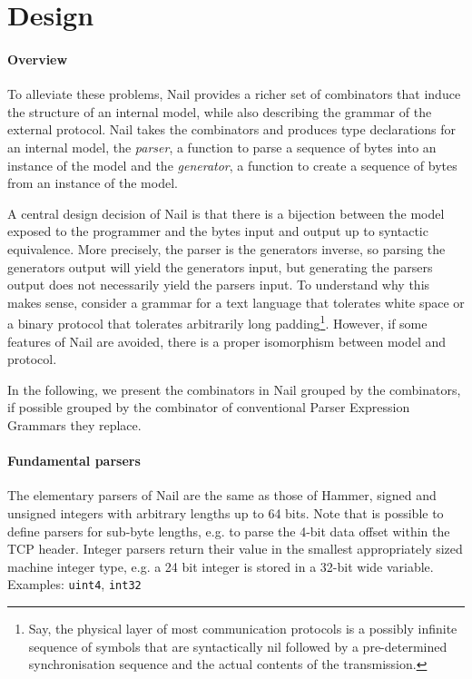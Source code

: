 \section{Design}

\paragraph{Overview}
To alleviate these problems, Nail provides a richer set of combinators that induce the structure of
an internal model, while also describing the grammar of the external protocol. Nail takes the
combinators and produces type declarations for an internal model, the \textit{parser}, a function to parse a sequence of
bytes into an instance of the model and the \textit{generator}, a function to create a sequence of
bytes from an instance of the model.

A central design decision of Nail is that there is a  bijection between the model exposed to the programmer and the bytes
input and output up to syntactic equivalence. More precisely, the parser is the generators inverse,
so parsing the generators output will yield the generators input, but generating the parsers output
does not necessarily yield the parsers input. To understand why this makes sense, consider a grammar
for a text language that tolerates white space or a binary protocol that tolerates arbitrarily long
padding\footnote{Say, the physical layer of most communication protocols is a possibly infinite
  sequence of symbols that are syntactically nil followed by a pre-determined synchronisation
  sequence and the actual contents of the transmission.}. However, if some features of Nail are
avoided, there is a proper isomorphism between model and protocol.

In the following, we present the combinators in Nail grouped by the combinators, if possible grouped
by the combinator of conventional Parser Expression Grammars they replace.
\paragraph{Fundamental parsers}
The elementary parsers of Nail are the same as those of Hammer, signed and unsigned integers with
arbitrary lengths up to 64 bits. Note that is possible to define parsers for sub-byte lengths, e.g.
to parse the 4-bit data offset within the TCP header. Integer parsers return their value in the
smallest appropriately sized machine integer type, e.g. a 24 bit integer is stored in a 32-bit wide variable.\\
Examples: \texttt{uint4}, \texttt{int32}


